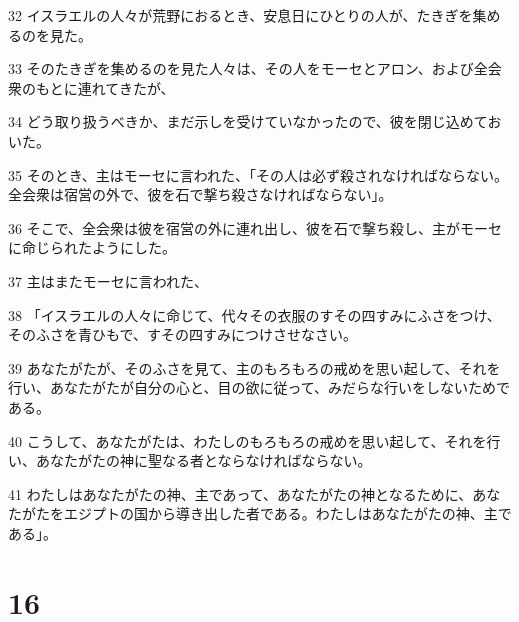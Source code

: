 \par 32 イスラエルの人々が荒野におるとき、安息日にひとりの人が、たきぎを集めるのを見た。
\par 33 そのたきぎを集めるのを見た人々は、その人をモーセとアロン、および全会衆のもとに連れてきたが、
\par 34 どう取り扱うべきか、まだ示しを受けていなかったので、彼を閉じ込めておいた。
\par 35 そのとき、主はモーセに言われた、「その人は必ず殺されなければならない。全会衆は宿営の外で、彼を石で撃ち殺さなければならない」。
\par 36 そこで、全会衆は彼を宿営の外に連れ出し、彼を石で撃ち殺し、主がモーセに命じられたようにした。
\par 37 主はまたモーセに言われた、
\par 38 「イスラエルの人々に命じて、代々その衣服のすその四すみにふさをつけ、そのふさを青ひもで、すその四すみにつけさせなさい。
\par 39 あなたがたが、そのふさを見て、主のもろもろの戒めを思い起して、それを行い、あなたがたが自分の心と、目の欲に従って、みだらな行いをしないためである。
\par 40 こうして、あなたがたは、わたしのもろもろの戒めを思い起して、それを行い、あなたがたの神に聖なる者とならなければならない。
\par 41 わたしはあなたがたの神、主であって、あなたがたの神となるために、あなたがたをエジプトの国から導き出した者である。わたしはあなたがたの神、主である」。

\chapter{16}

